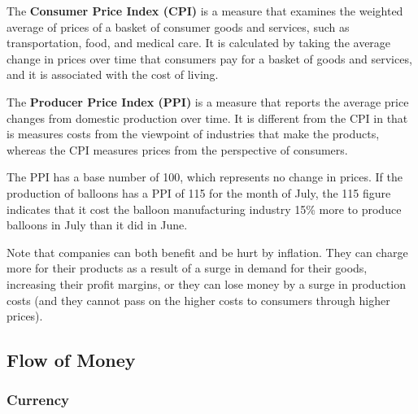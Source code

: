 \documentclass{article}
\begin{document}
    \begin{definition}
      The \textbf{Consumer Price Index (CPI)} is a measure that examines the weighted average of prices of a basket of consumer goods and services, such as transportation, food, and medical care. It is calculated by taking the average change in prices over time that consumers pay for a basket of goods and services, and it is associated with the cost of living. 
    \end{definition}

    \begin{definition}
      The \textbf{Producer Price Index (PPI)} is a measure that reports the average price changes from domestic production over time. It is different from the CPI in that is measures costs from the viewpoint of industries that make the products, whereas the CPI measures prices from the perspective of consumers. 
    \end{definition}

    \begin{example}
      The PPI has a base number of 100, which represents no change in prices. If the production of balloons has a PPI of 115 for the month of July, the 115 figure indicates that it cost the balloon manufacturing industry 15\% more to produce balloons in July than it did in June. 
    \end{example}

    Note that companies can both benefit and be hurt by inflation. They can charge more for their products as a result of a surge in demand for their goods, increasing their profit margins, or they can lose money by a surge in production costs (and they cannot pass on the higher costs to consumers through higher prices). 

  \subsection{Flow of Money}

    \subsubsection{Currency}
\end{document}
